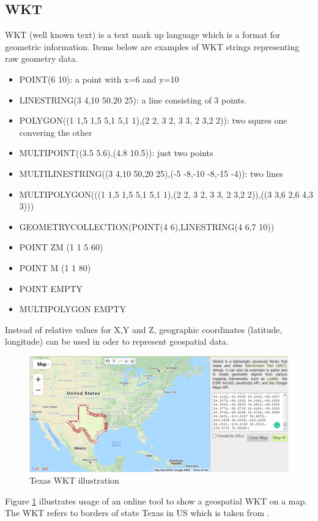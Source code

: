 \documentclass[a4]{report}
\begin{document}
    \subsection{WKT}
    WKT (well known text)  \cite{WKT} is a text mark up language which is a format for geometric information.
    Items below are examples of WKT strings representing raw geometry data.
    \begin{itemize}
        \item POINT(6 10): a point with x=6 and y=10
        \item LINESTRING(3 4,10 50,20 25): a line consisting of 3 points.
        \item POLYGON((1 1,5 1,5 5,1 5,1 1),(2 2, 3 2, 3 3, 2 3,2 2)): two squres one convering the other
        \item MULTIPOINT((3.5 5.6),(4.8 10.5)): just two points
        \item MULTILINESTRING((3 4,10 50,20 25),(-5 -8,-10 -8,-15 -4)): two lines
        \item MULTIPOLYGON(((1 1,5 1,5 5,1 5,1 1),(2 2, 3 2, 3 3, 2 3,2 2)),((3 3,6 2,6 4,3 3)))
        \item GEOMETRYCOLLECTION(POINT(4 6),LINESTRING(4 6,7 10))
        \item POINT ZM (1 1 5 60)
        \item POINT M (1 1 80)
        \item POINT EMPTY
        \item MULTIPOLYGON EMPTY
    \end{itemize}

    Instead of relative values for X,Y and Z, geographic coordinates (latitude, longitude) can be used in oder to
    represent geospatial data.

    \begin{figure}[ht]
        \caption{Texas WKT illustration}
        \label{fig:texas}
        \includegraphics[scale=0.4]{images/texas.png}
    \end{figure}
    Figure \ref{fig:texas} illustrates usage of an online tool \cite{WKTtool} to show a geospatial WKT on a map.
    The WKT refers to borders of state Texas in US which is taken from \cite{WKTs}.
\end{document}
